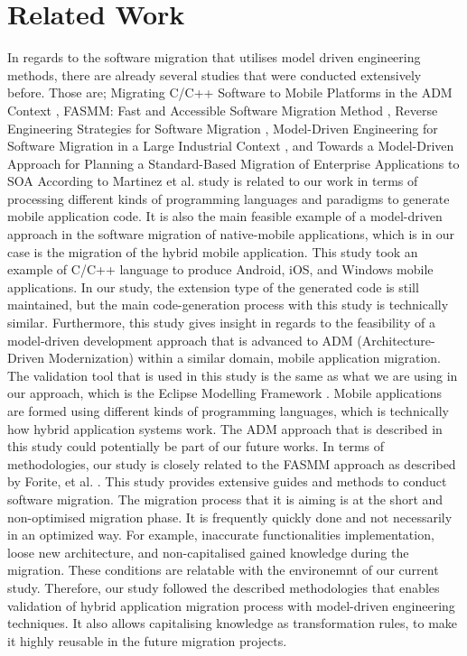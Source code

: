\documentclass[conference]{IEEEtran}
\begin{document}
\section{Related Work}
In regards to the software migration that utilises model driven engineering methods,
there are already several studies that were conducted extensively before.
Those are; Migrating C/C++ Software to Mobile Platforms in the ADM Context \cite{b6},
FASMM: Fast and Accessible Software Migration Method \cite{b7}, Reverse Engineering
Strategies for Software Migration \cite{b8}, Model-Driven Engineering
for Software Migration in a Large Industrial Context \cite{b9}, and
Towards a Model-Driven Approach for Planning a
Standard-Based Migration of Enterprise Applications to SOA \cite{b10}
\newline \newline
According to Martinez et al.\cite{b6} study is related to our work in terms of processing different kinds of
programming languages and paradigms to generate mobile application code. It is also
the main feasible example of a model-driven approach in the software migration of native-mobile applications,
which is in our case is the migration of the hybrid mobile application.
This study took an example of C/C++ language to produce Android, iOS, and Windows mobile applications.
In our study, the extension type of the generated code is still maintained, but the main code-generation process with this study
is technically similar.
\newline \newline
Furthermore, this study gives insight in regards to the feasibility of a model-driven development approach that is
advanced to ADM (Architecture-Driven Modernization) within a similar domain, mobile application migration.
The validation tool that is used in this study is the same as what we are using in our approach, which is the Eclipse Modelling Framework \cite{b2}.
Mobile applications are formed using different kinds of programming languages, which is technically
how hybrid application systems work.
The ADM approach that is described in this study could potentially be part of our future works.
\newline \newline
In terms of methodologies, our study is closely related to the FASMM approach as described by Forite, et al. \cite{b3} .
This study provides extensive guides and methods to conduct software migration. The migration
process that it is aiming is at the short and non-optimised migration phase.
It is frequently quickly done and not necessarily in an optimized way. For example,
inaccurate functionalities implementation, loose new architecture, and non-capitalised gained knowledge
during the migration. These conditions are relatable with the environemnt of our current study.
Therefore, our study followed the described methodologies that enables validation of
hybrid application migration process with model-driven engineering techniques. It also allows
capitalising knowledge as transformation rules, to make it highly reusable in the future migration projects.
\newline \newline
\end{document}

